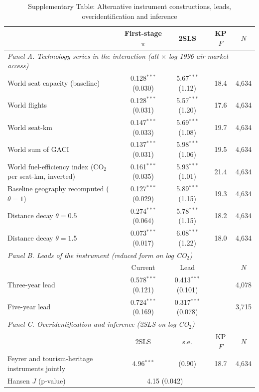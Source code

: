 \begin{table}[htbp]
\centering
\begin{threeparttable}
\caption{Supplementary Table: Alternative instrument constructions, leads, overidentification and inference}
\label{tab:exclusion2}
\scriptsize
\begin{tabular}{lcccc}
\toprule
 & First-stage $\pi$ & 2SLS & KP $F$ & $N$ \\
\midrule
\multicolumn{5}{l}{\textit{Panel A. Technology series in the interaction (all $\times$ log 1996 air market access)}} \\
  World seat capacity (baseline) & 0.128$^{***}$ (0.030) & 5.67$^{***}$ (1.12) & 18.4 & 4,634 \\
  World flights & 0.128$^{***}$ (0.031) & 5.57$^{***}$ (1.20) & 17.6 & 4,634 \\
  World seat-km & 0.147$^{***}$ (0.033) & 5.69$^{***}$ (1.08) & 19.7 & 4,634 \\
  World sum of GACI & 0.137$^{***}$ (0.031) & 5.98$^{***}$ (1.06) & 19.5 & 4,634 \\
  World fuel-efficiency index (CO$_2$ per seat-km, inverted) & 0.161$^{***}$ (0.035) & 5.93$^{***}$ (1.01) & 21.4 & 4,634 \\
  Baseline geography recomputed ($\theta = 1$) & 0.127$^{***}$ (0.029) & 5.89$^{***}$ (1.15) & 19.3 & 4,634 \\
  Distance decay $\theta = 0.5$ & 0.274$^{***}$ (0.064) & 5.78$^{***}$ (1.15) & 18.2 & 4,634 \\
  Distance decay $\theta = 1.5$ & 0.073$^{***}$ (0.017) & 6.08$^{***}$ (1.22) & 18.0 & 4,634 \\
\midrule
\multicolumn{5}{l}{\textit{Panel B. Leads of the instrument (reduced form on log CO$_2$)}} \\
 & Current & Lead & & $N$ \\
  Three-year lead & 0.578$^{***}$ (0.121) & 0.413$^{***}$ (0.101) & & 4,078 \\
  Five-year lead & 0.724$^{***}$ (0.169) & 0.317$^{***}$ (0.078) & & 3,715 \\
\midrule
\multicolumn{5}{l}{\textit{Panel C. Overidentification and inference (2SLS on log CO$_2$)}} \\
 & 2SLS & s.e. & KP $F$ & $N$ \\
  Feyrer and tourism-heritage instruments jointly & 4.96$^{***}$ & (0.90) & 18.7 & 4,634 \\
  \quad Hansen $J$ (p-value) & \multicolumn{2}{c}{4.15 (0.042)} & & \\

\end{tabular}
\end{threeparttable}
\end{table}
